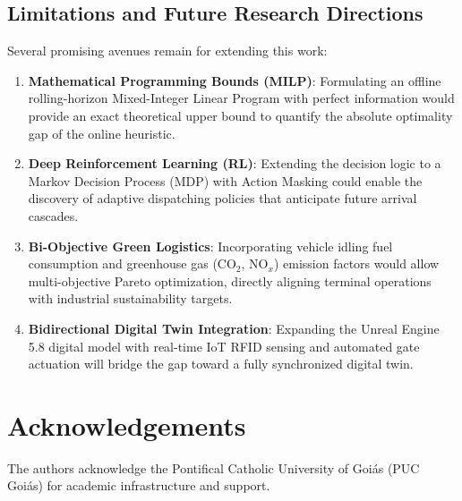 \documentclass[11pt,a4paper]{article}
\begin{document}
\subsection{Limitations and Future Research Directions}
Several promising avenues remain for extending this work:
\begin{enumerate}[leftmargin=1.2cm,itemsep=0pt,topsep=2pt]
  \item \textbf{Mathematical Programming Bounds (MILP)}: Formulating an offline rolling-horizon Mixed-Integer Linear Program with perfect information would provide an exact theoretical upper bound to quantify the absolute optimality gap of the online heuristic.
  \item \textbf{Deep Reinforcement Learning (RL)}: Extending the decision logic to a Markov Decision Process (MDP) with Action Masking could enable the discovery of adaptive dispatching policies that anticipate future arrival cascades.
  \item \textbf{Bi-Objective Green Logistics}: Incorporating vehicle idling fuel consumption and greenhouse gas ($\text{CO}_2$, $\text{NO}_x$) emission factors would allow multi-objective Pareto optimization, directly aligning terminal operations with industrial sustainability targets.
  \item \textbf{Bidirectional Digital Twin Integration}: Expanding the Unreal Engine 5.8 digital model with real-time IoT RFID sensing and automated gate actuation will bridge the gap toward a fully synchronized digital twin.
\end{enumerate}

\section*{Acknowledgements}
The authors acknowledge the Pontifical Catholic University of Goi{\'a}s (PUC Goi{\'a}s) for academic infrastructure and support.

\printbibliography
\end{document}
